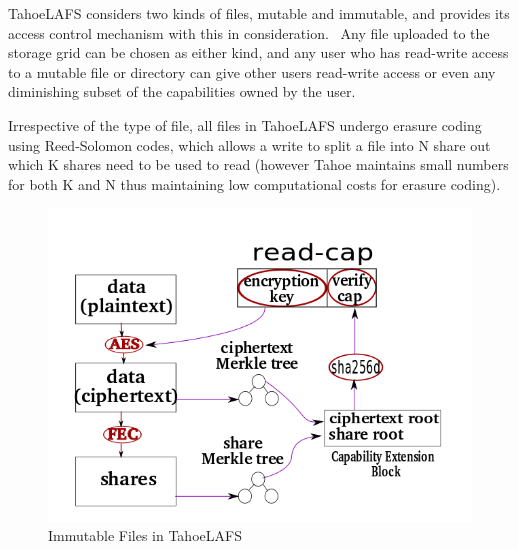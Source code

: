 TahoeLAFS considers two kinds of files, mutable and immutable, and provides its access control mechanism with this in consideration.~\cite{tahoelafs} Any file uploaded to the storage grid can be chosen as either kind, and any user who has read-write access to a mutable file or directory can give other users read-write access or even any diminishing subset of the capabilities owned by the user. 

Irrespective of the type of file, all files in TahoeLAFS undergo erasure coding using Reed-Solomon codes, which allows a write to split a file into N share out which K shares need to be used to read (however Tahoe maintains small numbers for both K and N thus maintaining low computational costs for erasure coding).

\begin{figure}[h]
\centering
\includegraphics[scale = 0.4]{img/immutable}
\caption{Immutable Files in TahoeLAFS}
\label{immutable}
\end{figure}

